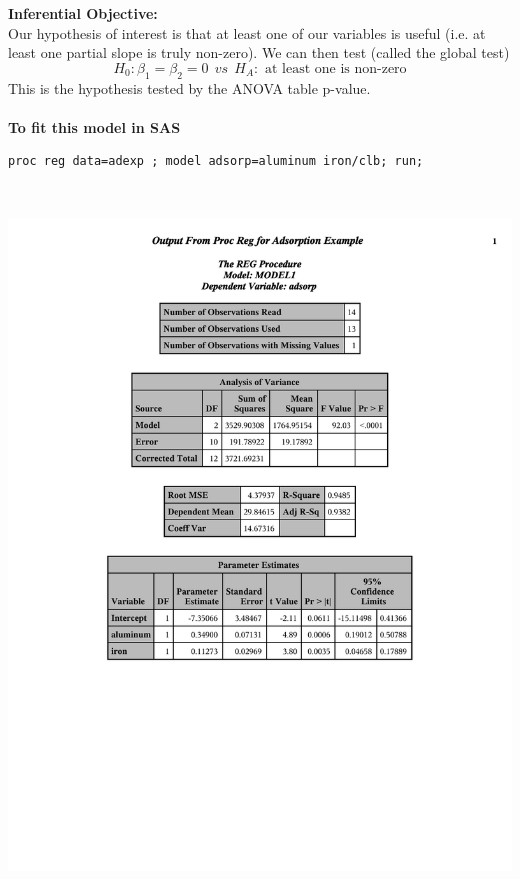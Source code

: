 \Large\textbf{Inferential Objective:}\large\\
Our hypothesis of interest is that at least one of our variables is useful (i.e. at least one partial slope is truly non-zero).  We can then test (called the global test)
$$H_0: \beta_1=\beta_2=0 ~~vs~~H_A: \text{ at least one is non-zero}$$
This is the hypothesis tested by the ANOVA table p-value.\\~\\

\textbf{To fit this model in SAS}
\begin{small}
\begin{verbatim}
proc reg data=adexp ; model adsorp=aluminum iron/clb; run;
\end{verbatim}
\end{small}
~\\
\begin{flushleft}
\includegraphics[page=1,scale=0.7,trim = 20mm 70mm 30mm 20mm]{mlradexp}\\
\end{flushleft}

